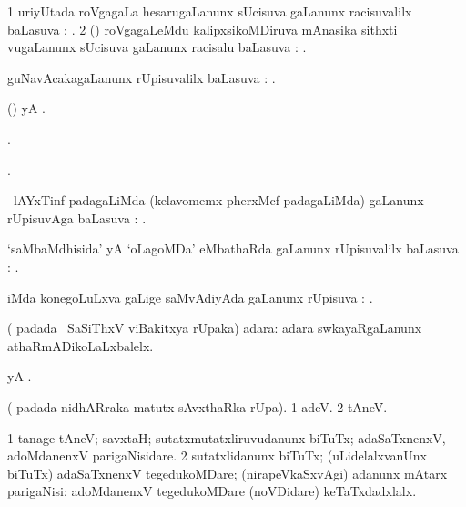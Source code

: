 \bentry
{}
\gl{\uparx}
\bmng
\bnum
\num{1} uriyUtada roVgagaLa hesarugaLanunx sUcisuva \nA gaLanunx racisuvalilx baLasuva \uparx: . 
\num{2} (\AmA) roVgagaLeMdu kalipxsikoMDiruva mAnasika sithxti \mo vugaLanunx sUcisuva \nA gaLanunx racisalu baLasuva \uparx: . 
\enum
\emng
\eentry

\bentry
{}
\gl{\uparx}
\bmng
guNavAcakagaLanunx rUpisuvalilx baLasuva \uparx: . 
\emng
\eentry

\bentry
{}
\bmng
(\AmA)  yA . 
\emng
\eentry

\bentry
{}
\gl{\saMkiSx}
\bmng
{}. 
\emng
\eentry

\bentry
{}
\gl{\saMkiSx}
\bmng
{}. 
\emng
\eentry

\bentry
{}
\gl{\uparx}
\bmng
\sA\ lAYxTinf padagaLiMda (kelavomemx pherxMcf padagaLiMda) \nA gaLanunx rUpisuvAga baLasuva \uparx: . 
\emng
\eentry

\bentry
{}
\gl{\uparx}
\bmng
`saMbaMdhisida' yA `oLagoMDa' eMbathaRda \gu gaLanunx rUpisuvalilx baLasuva \uparx: . 
\emng
\eentry

\bentry
{}
\gl{\uparx}
\bmng
{} iMda konegoLuLxva \nA gaLige saMvAdiyAda \gu gaLanunx rUpisuva \uparx: . 
\emng
\eentry

\bentry
{}
\gl{\sanA}
\bmng
( padada \Eva\ SaSiThxV viBakitxya rUpaka) adara:  adara swkayaRgaLanunx athaRmADikoLaLxbalelx. 
\emng
\eentry

\bentry
{}
\bmng
{} yA . 
\emng
\eentry

\bentry
{}
\gl{\sanA}
\bmng
( padada nidhARraka matutx sAvxthaRka rUpa). 
\bnum
\num{1} adeV. 
\hypertarget{itself(2)}{} 
\num{2} tAneV. 
\enum
\emng

\noindent 
\gl{\pagu}
\bmng
\bnum
\num{1}  tanage tAneV; savxtaH; sutatxmutatxliruvudanunx biTuTx; adaSaTxnenxV, adoMdanenxV parigaNisidare. 
\num{2}  sutatxlidanunx biTuTx; (uLidelalxvanUnx biTuTx) adaSaTxnenxV tegedukoMDare; (nirapeVkaSxvAgi) adanunx mAtarx parigaNisi:  adoMdanenxV tegedukoMDare (noVDidare) keTaTxdadxlalx. 
\enum
\emng
\eentry

